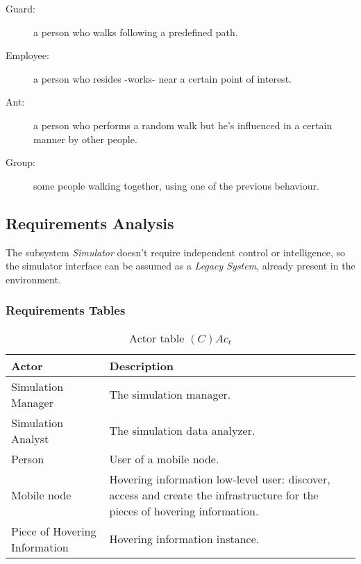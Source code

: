 \begin{description}
	\item[Guard:] a person who walks following a predefined path.
	\item[Employee:] a person who resides -works- near a certain point of interest.
	\item[Ant:] a person who performs a random walk but he's influenced in a
		certain manner by other people.
	\item[Group:] some people walking together, using one of the previous
		behaviour.
\end{description}

\subsection{Requirements Analysis}

The subsystem \emph{Simulator} doesn't require independent control or
intelligence, so the simulator interface can be assumed as a \emph{Legacy
System}, already present in the environment.

\subsubsection{Requirements Tables}

\begin{table}[H]
	\centering
	\begin{tabular}{|p{4cm}|p{8cm}|}
			\hline
			\textbf{Actor} & \textbf{Description} \\
			\hline
			Simulation Manager & The simulation manager. \\
			\hline
			Simulation Analyst & The simulation data analyzer. \\
			\hline
			Person & User of a mobile node. \\
			\hline
			Mobile node & Hovering information low-level user: discover, access and
			create the infrastructure for the pieces of hovering information. \\
			\hline
			Piece of Hovering Information & Hovering information instance. \\
			\hline
		\end{tabular}
	\caption{Actor table $(C)Ac_t$}
	\label{tab:cact}
\end{table}

